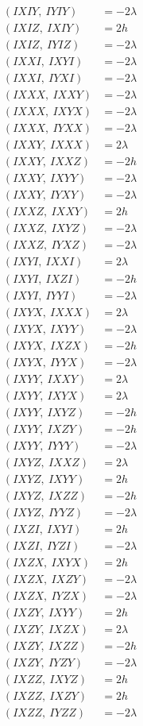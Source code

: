 \documentclass{article}
\begin{document}
\begin{align*}
  (IXIY,\ IYIY) &= - 2 \lambda \\
  (IXIZ,\ IXIY) &= 2 h \\
  (IXIZ,\ IYIZ) &= - 2 \lambda \\
  (IXXI,\ IXYI) &= - 2 \lambda \\
  (IXXI,\ IYXI) &= - 2 \lambda \\
  (IXXX,\ IXXY) &= - 2 \lambda \\
  (IXXX,\ IXYX) &= - 2 \lambda \\
  (IXXX,\ IYXX) &= - 2 \lambda \\
  (IXXY,\ IXXX) &= 2 \lambda \\
  (IXXY,\ IXXZ) &= - 2 h \\
  (IXXY,\ IXYY) &= - 2 \lambda \\
  (IXXY,\ IYXY) &= - 2 \lambda \\
  (IXXZ,\ IXXY) &= 2 h \\
  (IXXZ,\ IXYZ) &= - 2 \lambda \\
  (IXXZ,\ IYXZ) &= - 2 \lambda \\
  (IXYI,\ IXXI) &= 2 \lambda \\
  (IXYI,\ IXZI) &= - 2 h \\
  (IXYI,\ IYYI) &= - 2 \lambda \\
  (IXYX,\ IXXX) &= 2 \lambda \\
  (IXYX,\ IXYY) &= - 2 \lambda \\
  (IXYX,\ IXZX) &= - 2 h \\
  (IXYX,\ IYYX) &= - 2 \lambda \\
  (IXYY,\ IXXY) &= 2 \lambda \\
  (IXYY,\ IXYX) &= 2 \lambda \\
  (IXYY,\ IXYZ) &= - 2 h \\
  (IXYY,\ IXZY) &= - 2 h \\
  (IXYY,\ IYYY) &= - 2 \lambda \\
  (IXYZ,\ IXXZ) &= 2 \lambda \\
  (IXYZ,\ IXYY) &= 2 h \\
  (IXYZ,\ IXZZ) &= - 2 h \\
  (IXYZ,\ IYYZ) &= - 2 \lambda \\
  (IXZI,\ IXYI) &= 2 h \\
  (IXZI,\ IYZI) &= - 2 \lambda \\
  (IXZX,\ IXYX) &= 2 h \\
  (IXZX,\ IXZY) &= - 2 \lambda \\
  (IXZX,\ IYZX) &= - 2 \lambda \\
  (IXZY,\ IXYY) &= 2 h \\
  (IXZY,\ IXZX) &= 2 \lambda \\
  (IXZY,\ IXZZ) &= - 2 h \\
  (IXZY,\ IYZY) &= - 2 \lambda \\
  (IXZZ,\ IXYZ) &= 2 h \\
  (IXZZ,\ IXZY) &= 2 h \\
  (IXZZ,\ IYZZ) &= - 2 \lambda
\end{align*}
\end{document}
